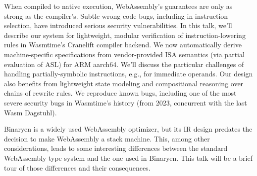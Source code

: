 \documentclass[a4paper,UKenglish]{dagrep-v2018}
\begin{document}
\license
{}

When compiled to native execution, WebAssembly’s guarantees are only as strong as the compiler’s. Subtle wrong-code bugs, including in instruction selection, have introduced serious security vulnerabilities. In this talk, we’ll describe our system for lightweight, modular verification of instruction-lowering rules in Wasmtime’s Cranelift compiler backend. We now automatically derive machine-specific specifications from vendor-provided ISA semantics (via partial evaluation of ASL) for ARM aarch64. We’ll discuss the particular challenges of handling partially-symbolic instructions, e.g., for immediate operands. Our design also benefits from lightweight state modeling and compositional reasoning over chains of rewrite rules. We reproduce known bugs, including one of the most severe security bugs in Wasmtime’s history (from 2023, concurrent with the last Wasm Dagstuhl).

\license
{}

Binaryen is a widely used WebAssembly optimizer, but its IR design predates the decision to make WebAssembly a stack machine. This, among other considerations, leads to some interesting differences between the standard WebAssembly type system and the one used in Binaryen. This talk will be a brief tour of those differences and their consequences.

\license
{}
\end{document}
